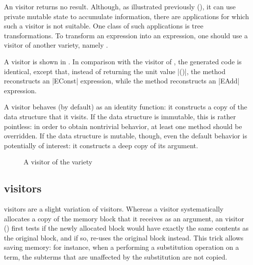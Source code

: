 \documentclass[11pt,a4paper,twoside]{article}
\begin{document}
An \iter visitor returns no result. Although, as illustrated previously
(), it can use private mutable state to accumulate
information, there are applications for which such a visitor is not suitable.
One class of such applications is tree transformations. To transform an
expression into an expression, one should use a visitor of another variety,
namely \map.

A \map visitor is shown in . In comparison with the \iter
visitor of , the generated code is identical, except that,
instead of returning the unit value \oc|()|, the method
 reconstructs an \oc|EConst| expression, while the
method  reconstructs an \oc|EAdd| expression.

A \map visitor behaves (by default) as an identity function: it constructs a
copy of the data structure that it visits. If the data structure is immutable,
this is rather pointless: in order to obtain nontrivial behavior, at least one
method should be overridden. If the data structure is mutable, though, even
the default behavior is potentially of interest: it constructs a deep copy of
its argument.


\begin{figure}[p]
\vspace{-\baselineskip}
\caption{A visitor of the \mapendo variety}
\label{fig:expr00endo}
\end{figure}

\subsection{\mapendo visitors}
\label{sec:intro:endo}

\mapendo visitors are a slight variation of \map visitors. Whereas a \map
visitor systematically allocates a copy of the memory block that it receives
as an argument, an \mapendo visitor () first tests if the
newly allocated block would have exactly the same contents as the original
block, and if so, re-uses the original block instead.
%
This trick allows saving memory: for instance, when a performing a
substitution operation on a term, the subterms that are unaffected
by the substitution are not copied.
\end{document}
